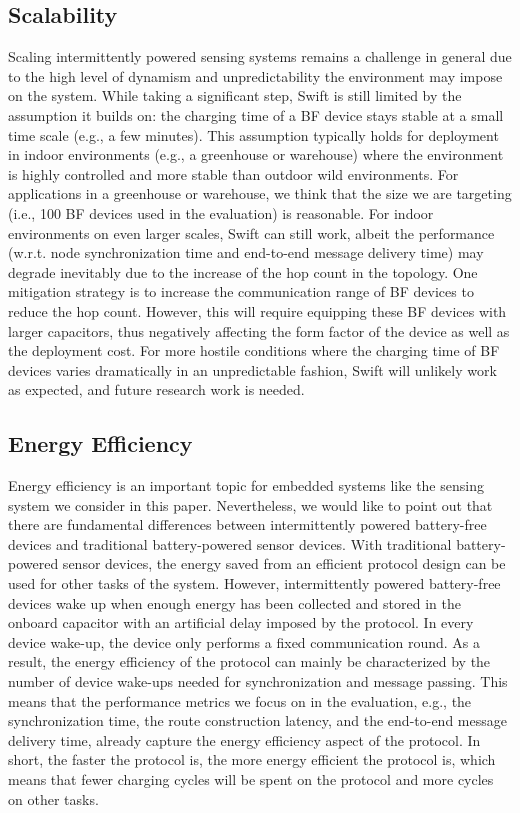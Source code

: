\documentclass[lettersize,journal]{IEEEtran}
\newcommand{\ours}{Swift\xspace}
\begin{document}
\subsection{Scalability}
Scaling intermittently powered sensing systems remains a challenge in general due to the high level of dynamism and unpredictability the environment may impose on the system. While taking a significant step, \ours is still limited by the assumption it builds on: the charging time of a BF device stays stable at a small time scale (e.g., a few minutes). This assumption typically holds for deployment in indoor environments (e.g., a greenhouse or warehouse) where the environment is highly controlled and more stable than outdoor wild environments. For applications in a greenhouse or warehouse, we think that the size we are targeting (i.e., 100 BF devices used in the evaluation) is reasonable. For indoor environments on even larger scales, Swift can still work, albeit the performance (w.r.t. node synchronization time and end-to-end message delivery time) may degrade inevitably due to the increase of the hop count in the topology. One mitigation strategy is to increase the communication range of BF devices to reduce the hop count. However, this will require equipping these BF devices with larger capacitors, thus negatively affecting the form factor of the device as well as the deployment cost. For more hostile conditions where the charging time of BF devices varies dramatically in an unpredictable fashion, Swift will unlikely work as expected, and future research work is needed.

\subsection{Energy Efficiency}
Energy efficiency is an important topic for embedded systems like the sensing system we consider in this paper. Nevertheless, we would like to point out that there are fundamental differences between intermittently powered battery-free devices and traditional battery-powered sensor devices. With traditional battery-powered sensor devices, the energy saved from an efficient protocol design can be used for other tasks of the system. However, intermittently powered battery-free devices wake up when enough energy has been collected and stored in the onboard capacitor with an artificial delay imposed by the protocol. In every device wake-up, the device only performs a fixed communication round. As a result, the energy efficiency of the protocol can mainly be characterized by the number of device wake-ups needed for synchronization and message passing.
This means that the performance metrics we focus on in the evaluation, e.g., the synchronization time, the route construction latency, and the end-to-end message delivery time, already capture the energy efficiency aspect of the protocol. In short, the faster the protocol is, the more energy efficient the protocol is, which means that fewer charging cycles will be spent on the protocol and more cycles on other tasks.
\end{document}
